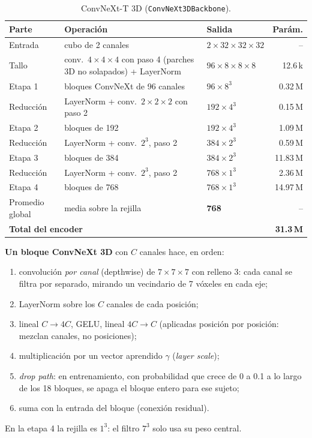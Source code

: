 \documentclass[11pt,a4paper]{article}
\begin{document}
\begin{table}[H]
\centering
\small
\begin{tabularx}{\textwidth}{l>{\raggedright\arraybackslash}Xlr}
\toprule
Parte & Operación & Salida & Parám. \\
\midrule
Entrada & cubo de 2 canales & $2\times32\times32\times32$ & -- \\
Tallo & conv.\ $4\times4\times4$ con paso 4 (parches 3D no solapados) + LayerNorm & $96\times8\times8\times8$ & 12.6\,k \\
Etapa 1 & 3 bloques ConvNeXt de 96 canales & $96\times8^3$ & 0.32\,M \\
Reducción & LayerNorm + conv.\ $2\times2\times2$ con paso 2 & $192\times4^3$ & 0.15\,M \\
Etapa 2 & 3 bloques de 192 & $192\times4^3$ & 1.09\,M \\
Reducción & LayerNorm + conv.\ $2^3$, paso 2 & $384\times2^3$ & 0.59\,M \\
Etapa 3 & 9 bloques de 384 & $384\times2^3$ & 11.83\,M \\
Reducción & LayerNorm + conv.\ $2^3$, paso 2 & $768\times1^3$ & 2.36\,M \\
Etapa 4 & 3 bloques de 768 & $768\times1^3$ & 14.97\,M \\
Promedio global & media sobre la rejilla & \textbf{768} & -- \\
\midrule
\multicolumn{3}{l}{\textbf{Total del encoder}} & \textbf{31.3\,M} \\
\bottomrule
\end{tabularx}
\caption{ConvNeXt-T 3D (\texttt{ConvNeXt3DBackbone}).}
\end{table}

\textbf{Un bloque ConvNeXt 3D} con $C$ canales hace, en orden:
\begin{enumerate}
\item convolución \emph{por canal} (depthwise) de $7\times7\times7$ con relleno 3: cada canal se
  filtra por separado, mirando un vecindario de 7 vóxeles en cada eje;
\item LayerNorm sobre los $C$ canales de cada posición;
\item lineal $C\rightarrow4C$, GELU, lineal $4C\rightarrow C$ (aplicadas posición por posición: mezclan
  canales, no posiciones);
\item multiplicación por un vector aprendido $\gamma$ (\emph{layer scale});
\item \emph{drop path}: en entrenamiento, con probabilidad que crece de 0 a 0.1 a lo largo de los 18
  bloques, se apaga el bloque entero para ese sujeto;
\item suma con la entrada del bloque (conexión residual).
\end{enumerate}
En la etapa 4 la rejilla es $1^3$: el filtro $7^3$ solo usa su peso central.
\end{document}
